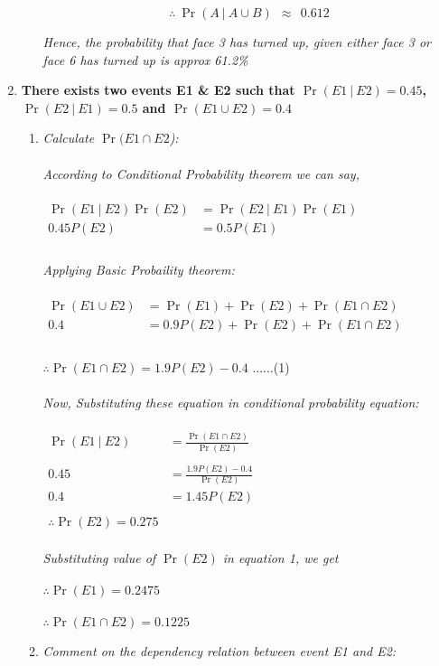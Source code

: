 \documentclass{article}
\begin{document}
\begin{enumerate}
\begin{enumerate}
        \[
          \boxed{\therefore\ \Pr(A \ |\ A \cup B)\ \ \approx \ \ 0.612}
        \]
        
        \textit{Hence, the probability that face 3 has turned up, given either face 3 or face 6 has turned up is approx 61.2\%}
\end{enumerate}
\newpage
\item \textbf{There exists two events E1 \& E2 such that $\Pr(E1 \ |\ E2) = 0.45$, $\Pr(E2 \ |\ E1) = 0.5$ and $\Pr(E1 \cup E2) = 0.4$}
  \begin{enumerate}
    \item\textit{Calculate $\Pr(E1 \cap E2$):}\\\\
    \textit{According to Conditional Probability theorem we can say,}\\\\
    $\begin{aligned}
      \Pr(E1 \ |\ E2)\Pr(E2) & = \Pr(E2 \ |\ E1)\Pr(E1)\\
      0.45P(E2) & = 0.5P(E1) \\
    \end{aligned}$\\\\
    \textit{Applying Basic Probaility theorem:}\\\\
    $\begin{aligned}
      \Pr(E1 \cup E2) & = \Pr(E1) + \Pr(E2) + \Pr(E1 \cap E2)\\
      0.4 & = 0.9P(E2) + \Pr(E2) + \Pr(E1 \cap E2)\\\\
    \end{aligned}$

    $\therefore \Pr(E1 \cap E2) = 1.9P(E2) - 0.4$ \hspace{8cm}......(1)\\\\
    \textit{Now, Substituting these equation in conditional probability equation:}\\\\
    $\begin{aligned}
      \Pr(E1 \ |\ E2) & = \frac{\Pr(E1 \cap E2)}{\Pr(E2)}\\\\
      0.45 & = \frac{1.9P(E2) - 0.4}{\Pr(E2)}\\
      0.4 & = 1.45P(E2)\\\\
      \therefore \Pr(E2) = 0.275
    \end{aligned}$\\\\
    \textit{Substituting value of $\Pr(E2)$ in equation 1, we get}\\\\
    $\therefore \Pr(E1) = 0.2475$\\\\
    $\therefore \Pr(E1 \cap E2) = 0.1225$\\
    \item \textit{ Comment on the dependency relation between event E1 and E2:}
    

\end{enumerate}
\end{enumerate}
\end{document}
